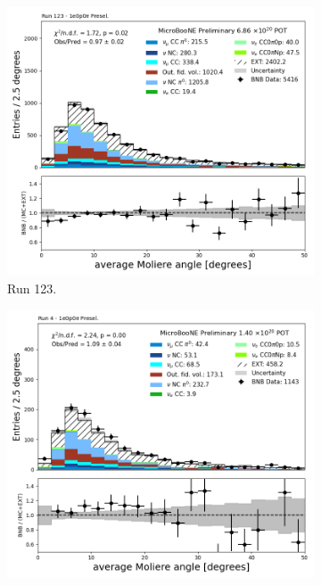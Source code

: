 \begin{figure}[H]
    \centering
    \begin{subfigure}[t]{0.32\linewidth}
        \includegraphics[width=\linewidth]{technote/Appendix_Preselection/Figures/1e0p0pi/Run123/shrmoliereavg_Run123_1e0p0pi_Presel.png}
        \caption{Run 123.}
    \end{subfigure}%
    \hspace{0.2cm}%
    \begin{subfigure}[t]{0.32\linewidth}
        \includegraphics[width=\linewidth]{technote/Appendix_Preselection/Figures/1e0p0pi/Run4b/shrmoliereavg_Run4b_1e0p0pi_Presel.png}

\end{subfigure}
\end{figure}
